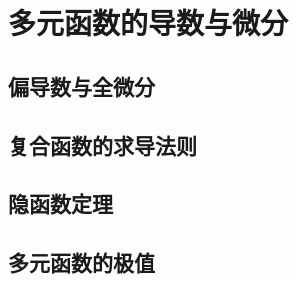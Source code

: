 \section{多元函数的导数与微分}
\subsection{偏导数与全微分}
\clearpage
\subsection{复合函数的求导法则}
\clearpage
\subsection{隐函数定理}
\clearpage
\subsection{多元函数的极值}
\clearpage

